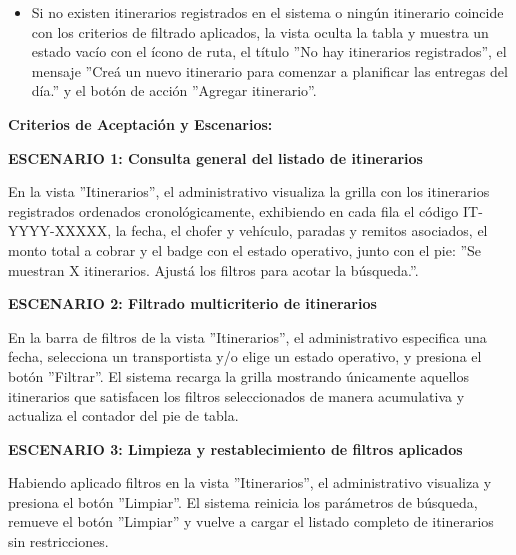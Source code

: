 \documentclass[a4paper,9pt]{article}
\begin{document}
\begin{tcolorbox}[hucard, title={\textbf{HU-60: LISTAR ITINERARIOS} \hfill \scriptsize \colorbox{tealstatus}{\textbf{\ Accepted\ }} \quad \colorbox{white}{\textcolor{primarydark}{\textbf{\ 2 pts\ }}}}]
{\begin{itemize}[leftmargin=12pt, nosep, itemsep=1.5pt, topsep=1pt]
\item Si no existen itinerarios registrados en el sistema o ningún itinerario coincide con los criterios de filtrado aplicados, la vista oculta la tabla y muestra un estado vacío con el ícono de ruta, el título ''No hay itinerarios registrados'', el mensaje ''Creá un nuevo itinerario para comenzar a planificar las entregas del día.'' y el botón de acción ''Agregar itinerario''.
\end{itemize}
}\par\vspace{3pt}
\noindent\textbf{\footnotesize Criterios de Aceptación y Escenarios:}\par\vspace{2pt}
{\footnotesize
\noindent\textbf{\textcolor{secondarydark}{ESCENARIO 1:  Consulta general del listado de itinerarios}}\par\vspace{1pt}
En la vista ''Itinerarios'', el administrativo visualiza la grilla con los itinerarios registrados ordenados cronológicamente, exhibiendo en cada fila el código IT-YYYY-XXXXX, la fecha, el chofer y vehículo, paradas y remitos asociados, el monto total a cobrar y el badge con el estado operativo, junto con el pie: ''Se muestran X itinerarios. Ajustá los filtros para acotar la búsqueda.''.\par\vspace{2.5pt}
\noindent\textbf{\textcolor{secondarydark}{ESCENARIO 2:  Filtrado multicriterio de itinerarios}}\par\vspace{1pt}
En la barra de filtros de la vista ''Itinerarios'', el administrativo especifica una fecha, selecciona un transportista y/o elige un estado operativo, y presiona el botón ''Filtrar''. El sistema recarga la grilla mostrando únicamente aquellos itinerarios que satisfacen los filtros seleccionados de manera acumulativa y actualiza el contador del pie de tabla.\par\vspace{2.5pt}
\noindent\textbf{\textcolor{secondarydark}{ESCENARIO 3:  Limpieza y restablecimiento de filtros aplicados}}\par\vspace{1pt}
Habiendo aplicado filtros en la vista ''Itinerarios'', el administrativo visualiza y presiona el botón ''Limpiar''. El sistema reinicia los parámetros de búsqueda, remueve el botón ''Limpiar'' y vuelve a cargar el listado completo de itinerarios sin restricciones.\par\vspace{2.5pt}
}
\end{tcolorbox}
\end{document}

